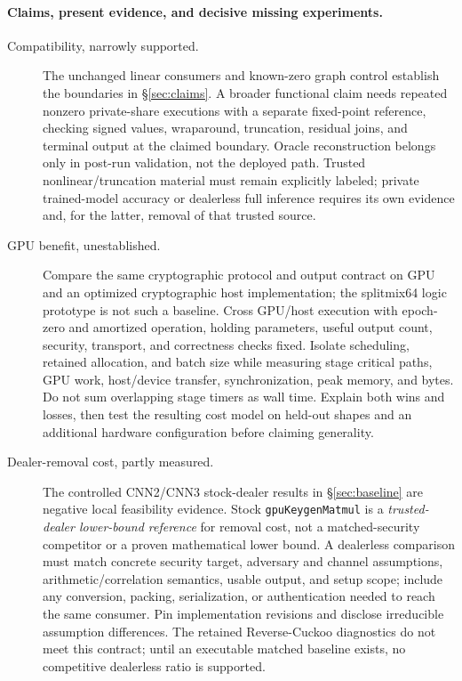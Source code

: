 \documentclass[11pt]{article}
\begin{document}
\paragraph{Claims, present evidence, and decisive missing experiments.}
\begin{description}
\item[Compatibility, narrowly supported.]
  The unchanged linear consumers and known-zero graph control establish the
  boundaries in \S\ref{sec:claims}. A broader functional claim needs repeated
  nonzero private-share executions with a separate fixed-point reference,
  checking signed values, wraparound, truncation, residual joins, and terminal
  output at the claimed boundary. Oracle reconstruction belongs only in
  post-run validation, not the deployed path. Trusted nonlinear/truncation
  material must remain explicitly labeled; private trained-model accuracy or
  dealerless full inference requires its own evidence and, for the latter,
  removal of that trusted source.
\item[GPU benefit, unestablished.]
  Compare the same cryptographic protocol and output contract on GPU and an
  optimized cryptographic host implementation; the splitmix64 logic prototype
  is not such a baseline. Cross GPU/host execution with epoch-zero and
  amortized operation, holding parameters, useful output count, security,
  transport, and correctness checks fixed. Isolate scheduling, retained
  allocation, and batch size while measuring stage critical paths, GPU work,
  host/device transfer, synchronization, peak memory, and bytes. Do not sum
  overlapping stage timers as wall time. Explain both wins and losses, then
  test the resulting cost model on held-out shapes and an additional hardware
  configuration before claiming generality.
\item[Dealer-removal cost, partly measured.]
  The controlled CNN2/CNN3 stock-dealer results in \S\ref{sec:baseline} are
  negative local feasibility evidence. Stock \texttt{gpuKeygenMatmul} is a
  \emph{trusted-dealer lower-bound reference} for removal cost, not a
  matched-security competitor or a proven mathematical lower bound. A
  dealerless comparison must match concrete security target, adversary and
  channel assumptions, arithmetic/correlation semantics, usable output, and
  setup scope; include any conversion, packing, serialization, or authentication
  needed to reach the same consumer. Pin implementation revisions and disclose
  irreducible assumption differences. The retained Reverse-Cuckoo diagnostics
  do not meet this contract; until an executable matched baseline exists, no
  competitive dealerless ratio is supported.
\end{description}
\end{document}
